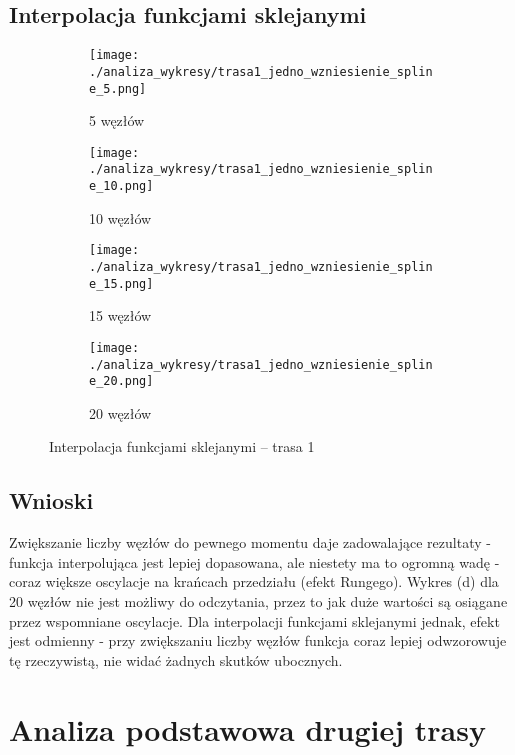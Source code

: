 \documentclass[a4paper,12pt]{article}
\begin{document}
\subsection{Interpolacja funkcjami sklejanymi}
\begin{figure}[H]
    \centering
    \begin{subfigure}{0.45\textwidth}
        \texttt{[image: ./analiza\_wykresy/trasa1\_jedno\_wzniesienie\_spline\_5.png]}
        \caption{5 węzłów}
    \end{subfigure}
    \hfill
    \begin{subfigure}{0.45\textwidth}
        \texttt{[image: ./analiza\_wykresy/trasa1\_jedno\_wzniesienie\_spline\_10.png]}
        \caption{10 węzłów}
    \end{subfigure}
    
    \vspace{1em}
    
    \begin{subfigure}{0.45\textwidth}
        \texttt{[image: ./analiza\_wykresy/trasa1\_jedno\_wzniesienie\_spline\_15.png]}
        \caption{15 węzłów}
    \end{subfigure}
    \hfill
    \begin{subfigure}{0.45\textwidth}
        \texttt{[image: ./analiza\_wykresy/trasa1\_jedno\_wzniesienie\_spline\_20.png]}
        \caption{20 węzłów}
    \end{subfigure}
    
    \caption{Interpolacja funkcjami sklejanymi – trasa 1}
\end{figure}

\subsection{Wnioski}
Zwiększanie liczby węzłów do pewnego momentu daje zadowalające rezultaty - funkcja interpolująca jest lepiej dopasowana, ale niestety ma to ogromną wadę - coraz większe oscylacje na krańcach przedziału (efekt Rungego). Wykres (d) dla 20 węzłów nie jest możliwy do odczytania, przez to jak duże wartości są osiągane przez wspomniane oscylacje. Dla interpolacji funkcjami sklejanymi jednak, efekt jest odmienny - przy zwiększaniu liczby węzłów funkcja coraz lepiej odwzorowuje tę rzeczywistą, nie widać żadnych skutków ubocznych.


\section{Analiza podstawowa drugiej trasy}
\end{document}
